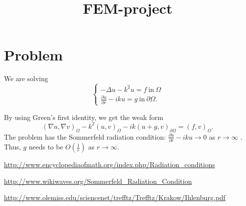 \documentclass[a4paper,12pt]{article}
\begin{document}
\title{FEM-project}
\author{}
\date{}
\maketitle
\section*{Problem}
We are solving \[ \begin{cases}
-\Delta u - k^2 u = f \ \mathrm{in} \ \Omega \\ \frac{\partial u}{\partial \bar{r}} - iku = g \ \mathrm{in} \ \partial \Omega.
\end{cases} \]

By using Green's first identity, we get the weak form \begin{equation*}
(\nabla u, \nabla v)_{\Omega} - k^2(u, v)_{\Omega} - ik(u + g, v)_{\partial \Omega} = (f, v)_{\Omega}.
\end{equation*} The problem has the Sommerfeld radiation condition: $\frac{\partial u}{\partial \bar{r}} - iku \rightarrow 0$ as $r \rightarrow \infty$ \cite{eom} \cite{wikiwaves}. Thus, $g$ needs to be $O(\frac{1}{r})$ as $r \rightarrow \infty$.

\begin{thebibliography}{9}

\url{http://www.encyclopediaofmath.org/index.php/Radiation_conditions}

\url{http://www.wikiwaves.org/Sommerfeld_Radiation_Condition}

\url{http://www.olemiss.edu/sciencenet/trefftz/Trefftz/Krakow/Ihlenburg.pdf}

\end{thebibliography}
\end{document}
